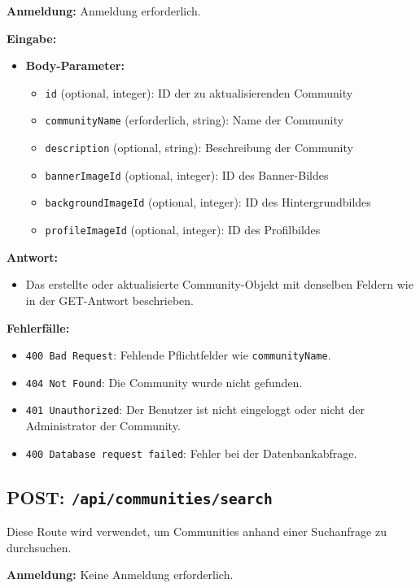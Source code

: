 \documentclass[a4paper,12pt]{article}
\begin{document}
\textbf{Anmeldung:} Anmeldung erforderlich.

\textbf{Eingabe:}
\begin{itemize}
    \item \textbf{Body-Parameter:}
    \begin{itemize}
        \item \texttt{id} (optional, integer): ID der zu aktualisierenden Community
        \item \texttt{communityName} (erforderlich, string): Name der Community
        \item \texttt{description} (optional, string): Beschreibung der Community
        \item \texttt{bannerImageId} (optional, integer): ID des Banner-Bildes
        \item \texttt{backgroundImageId} (optional, integer): ID des Hintergrundbildes
        \item \texttt{profileImageId} (optional, integer): ID des Profilbildes
    \end{itemize}
\end{itemize}

\textbf{Antwort:}
\begin{itemize}
    \item Das erstellte oder aktualisierte Community-Objekt mit denselben Feldern wie in der GET-Antwort beschrieben.
\end{itemize}

\textbf{Fehlerfälle:}
\begin{itemize}
    \item \texttt{400 Bad Request}: Fehlende Pflichtfelder wie \texttt{communityName}.
    \item \texttt{404 Not Found}: Die Community wurde nicht gefunden.
    \item \texttt{401 Unauthorized}: Der Benutzer ist nicht eingeloggt oder nicht der Administrator der Community.
    \item \texttt{400 Database request failed}: Fehler bei der Datenbankabfrage.
\end{itemize}

\newpage
\subsection{POST: \texttt{/api/communities/search}}

Diese Route wird verwendet, um Communities anhand einer Suchanfrage zu durchsuchen.

\textbf{Anmeldung:} Keine Anmeldung erforderlich.
\end{document}
